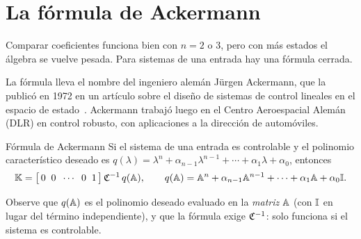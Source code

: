 \section{La fórmula de Ackermann}
\label{sec:re-ackermann}

Comparar coeficientes funciona bien con $n=2$ o $3$, pero con más estados el álgebra se vuelve pesada. Para sistemas de una entrada hay una fórmula cerrada.

\begin{historia}
La fórmula lleva el nombre del ingeniero alemán Jürgen Ackermann, que la publicó en 1972 en un artículo sobre el diseño de sistemas de control lineales en el espacio de estado~\citep{Ack72}. Ackermann trabajó luego en el Centro Aeroespacial Alemán (DLR) en control robusto, con aplicaciones a la dirección de automóviles.
\end{historia}

\begin{definicion}[label=def:re-ackermann]{Fórmula de Ackermann}
Si el sistema de una entrada es controlable y el polinomio característico deseado es $q(\lambda)=\lambda^n+\alpha_{n-1}\lambda^{n-1}+\cdots+\alpha_1\lambda+\alpha_0$, entonces
\begin{equation}
  \mathbb{K}=\bigl[\,0\;\;0\;\;\cdots\;\;0\;\;1\,\bigr]\,\mathfrak{C}^{-1}\,q(\mathbb{A}),
  \qquad
  q(\mathbb{A})=\mathbb{A}^n+\alpha_{n-1}\mathbb{A}^{n-1}+\cdots+\alpha_1\mathbb{A}+\alpha_0\mathbb{I}.
  \label{eq:re-ackermann}
\end{equation}
\end{definicion}

Observe que $q(\mathbb{A})$ es el polinomio deseado evaluado en la \emph{matriz} $\mathbb{A}$ (con $\mathbb{I}$ en lugar del término independiente), y que la fórmula exige $\mathfrak{C}^{-1}$: solo funciona si el sistema es controlable.


